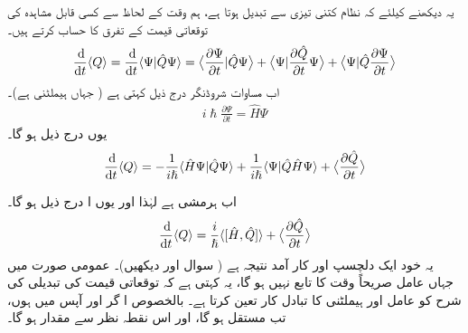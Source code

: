  یہ دیکھنے کیلئے کہ نظام کتنی تیزی سے تبدیل ہوتا ہے،   ہم  وقت کے لحاظ سے کسی قابل مشاہدہ  کی توقعاتی قیمت  کے  تفرق کا حساب  کرتے ہیں۔ 
\begin{align*}
\frac{\dif}{\dif t} \langle Q \rangle = \frac{\dif}{\dif t} \langle \Psi | \hat{Q} \Psi \rangle = \big\langle \frac{\partial\Psi}{\partial t} \vert \hat{Q} \Psi \big\rangle + \big\langle \Psi \vert \frac{\partial \hat{Q}}{\partial t} \Psi \big\rangle + \big\langle \Psi \vert \hat{Q} \frac{\partial \Psi}{\partial t} \big\rangle 
\end{align*}
اب مساوات  شروڈنگر   درج ذیل کہتی ہے (  جہاں  ہیملٹنی ہے)۔ 
\begin{align*}
i \hslash \frac{\partial \Psi}{\partial t} = \hat{H} \Psi
\end{align*}
یوں درج ذیل ہو گا۔ 
\begin{align*}
\frac{\dif}{\dif t}\langle Q\rangle =-\frac{1}{i \hslash} \langle \hat{H}\Psi | \hat{Q} \Psi\rangle+\frac{1}{i\hslash}\langle \Psi |\hat{Q} \hat{H} \Psi\rangle +\big \langle \frac{\partial \hat{Q}}{\partial t}\big \rangle
\end{align*}

اب  ہرمشی ہے لہٰذا   اور یوں ا درج ذیل ہو گا۔
\begin{align}\label{مساوات_قواعد_شرح_تبدیلی_قابل_مشاہدہ}
\frac{\dif}{\dif t} \langle Q \rangle = \frac{i}{\hslash} \langle [ \hat{H} , \hat{Q} ] \rangle + \big\langle \frac{\partial \hat{Q}}{\partial t} \big\rangle 
\end{align}
یہ  خود  ایک دلچسپ اور کار آمد نتیجہ ہے ( سوال    اور  دیکھیں)۔  عمومی   صورت میں جہاں  عامل صریحاً وقت کا تابع نہیں  ہو گا،   یہ کہتی ہے کہ توقعاتی قیمت  کی تبدیلی کی شرح کو    عامل اور ہیملٹنی کا تبادل کار تعین کرتا ہے۔ بالخصوص  ا  گر  اور   آپس میں  ہوں، تب  مستقل ہو گا،  اور اس نقطہ نظر سے   مقدار ہو گا۔

